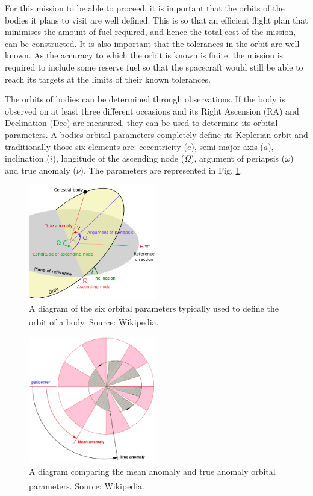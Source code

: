 \documentclass[10pt, twocolumn]{revtex4}    %
\newcommand{\scite}[1]{\textsuperscript{\cite{#1}}}
\begin{document}
For this mission to be able to proceed, it is important that the orbits of the bodies it plans to visit are well defined. This is so that an efficient flight plan that minimises the amount of fuel required, and hence the total cost of the mission, can be constructed. It is also important that the tolerances in the orbit are well known. As the accuracy to which the orbit is known is finite, the mission is required to include some reserve fuel so that the spacecraft would still be able to reach its targets at the limits of their known tolerances.

The orbits of bodies can be determined through observations. If the body is observed on at least three different occasions and its Right Ascension (RA) and Declination (Dec) are measured, they can be used to determine its orbital parameters. A bodies orbital parameters completely define its Keplerian orbit and traditionally those six elements are: eccentricity ($e$), semi-major axis ($a$), inclination ($i$), longitude of the ascending node ($\Omega$), argument of periapsis ($\omega$) and true anomaly ($\nu$). The parameters are represented in Fig. \ref{fig: orbital params}.

\begin{figure}[h!]
\centering
\includegraphics[width=0.5\textwidth]{Orbit1.png}
\caption{A diagram of the six orbital parameters typically used to define the orbit of a body. Source: Wikipedia.\scite{FileOrbit1svg}}
\label{fig: orbital params}
\end{figure}

\begin{figure}[h!]
\centering
\includegraphics[width=0.5\textwidth]{Mean_anomaly_diagram.png}
\caption{A diagram comparing the mean anomaly and true anomaly orbital parameters. Source: Wikipedia.\scite{Meananomalydiagram2015}}
\label{fig: mean-true anom}
\end{figure}
\end{document}

